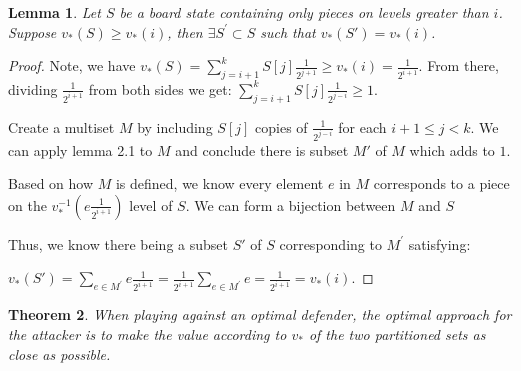 \documentclass{article}
\theoremstyle{plain}
\newtheorem{thm}{Theorem}[section]
\newtheorem{lem}[thm]{Lemma}
\theoremstyle{definition}
\theoremstyle{remark}
\begin{document}
\begin{lem}
	Let $S$ be a board state containing only pieces on levels greater than $i$. Suppose $v_{*}(S) \ge v_{*}(i)$, then $\exists S^{'} \subset S$ such that $v_{*}(S') = v_{*}(i)$.
\end{lem}


\begin{proof}
	Note, we have $v_{*}(S) = \sum_{j = i + 1}^k S[j]\frac{1}{2^{j+1}}\ge v_*(i) = \frac{1}{2^{i+1}}$. From there, dividing $\frac{1}{2^{i+1}}$ from both sides we get: $\sum_{j = i + 1}^k S[j]\frac{1}{2^{j-i}} \ge 1$.
	
	Create a multiset $M$ by including $S[j]$ copies of $\frac{1}{2^{j-i}}$ for each $i + 1 \le j < k$. We can apply lemma 2.1 to $M$ and conclude there is subset $M'$ of $M$ which adds to $1$. 
	
	Based on how $M$ is defined, we know every element $e$ in $M$ corresponds to a piece on the $v_{*}^{-1}(e\frac{1}{2^{i+1}})$ level of $S$. We can form a bijection between $M$ and $S$
	
	Thus, we know there being a subset $S'$ of $S$ corresponding to $M^{'}$ satisfying:
	
	$v_{*}(S') = \sum_{e \in M^{'}} e \frac{1}{2^{i+1}} = \frac{1}{2^{i+1}}\sum_{e \in M^{'}} e =   \frac{1}{2^{i+1}} = v_{*}(i)$.
\end{proof}

\begin{thm}
	When playing against an optimal defender, the optimal approach for the attacker is to make the value according to $v_{*}$ of the two partitioned sets as close as possible.
\end{thm}
\end{document}
